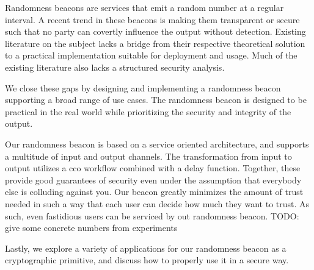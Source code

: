 Randomness beacons are services that emit a random number at a regular interval.
A recent trend in these beacons is making them transparent or secure such that no party can covertly influence the output without detection.
Existing literature on the subject lacks a bridge from their respective theoretical solution to a practical implementation suitable for deployment and usage. Much of the existing literature also lacks a structured security analysis.

We close these gaps by designing and implementing a randomness beacon supporting a broad range of use cases. The randomness beacon is designed to be practical in the real world while prioritizing the security and integrity of the output.

Our randomness beacon is based on a service oriented architecture, and supports a multitude of input and output channels.
The transformation from input to output utilizes a \gls{cco} workflow combined with a delay function. Together, these provide good guarantees of security even under the assumption that everybody else is colluding against you.
Our beacon greatly minimizes the amount of trust needed in such a way that each user can decide how much they want to trust. As such, even fastidious users can be serviced by out randomness beacon. TODO: give some concrete numbers from experiments

Lastly, we explore a variety of applications for our randomness beacon as a cryptographic primitive, and discuss how to properly use it in a secure way.

\glsresetall